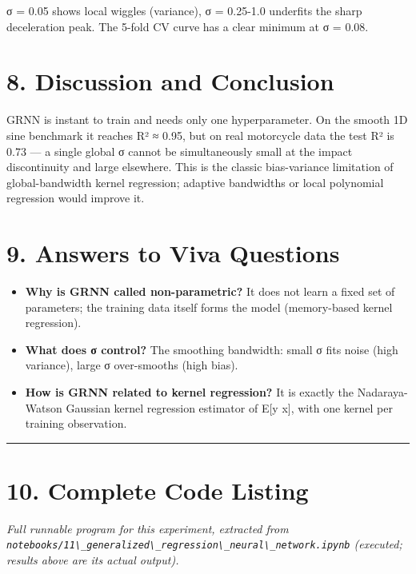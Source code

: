 σ = 0.05 shows local wiggles (variance), σ = 0.25-1.0 underfits the
sharp deceleration peak. The 5-fold CV curve has a clear minimum at σ =
0.08.

\section{8. Discussion and Conclusion}\label{discussion-and-conclusion}

GRNN is instant to train and needs only one hyperparameter. On the
smooth 1D sine benchmark it reaches R² ≈ 0.95, but on real motorcycle
data the test R² is 0.73 --- a single global σ cannot be simultaneously
small at the impact discontinuity and large elsewhere. This is the
classic bias-variance limitation of global-bandwidth kernel regression;
adaptive bandwidths or local polynomial regression would improve it.

\section{9. Answers to Viva Questions}\label{answers-to-viva-questions}

\begin{itemize}
\tightlist
\item
  \textbf{Why is GRNN called non-parametric?} It does not learn a fixed
  set of parameters; the training data itself forms the model
  (memory-based kernel regression).
\item
  \textbf{What does σ control?} The smoothing bandwidth: small σ fits
  noise (high variance), large σ over-smooths (high bias).
\item
  \textbf{How is GRNN related to kernel regression?} It is exactly the
  Nadaraya-Watson Gaussian kernel regression estimator of E{[}y
  \textbar{} x{]}, with one kernel per training observation.
\end{itemize}

\begin{center}\rule{0.5\linewidth}{0.5pt}\end{center}

\section{10. Complete Code Listing}\label{complete-code-listing}

\emph{Full runnable program for this experiment, extracted from
\passthrough{\lstinline!notebooks/11\_generalized\_regression\_neural\_network.ipynb!}
(executed; results above are its actual output).}

